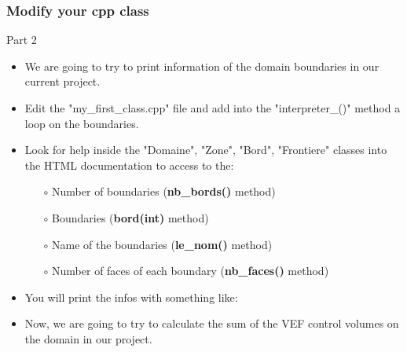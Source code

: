 \documentclass[10pt, hyperref={unicode=true,pdfusetitle, bookmarks=true,bookmarksnumbered=false,bookmarksopen=false, breaklinks=false,pdfborder={0 0 1},backref=true,colorlinks=true,linkcolor=darkblue,pageanchor, urlcolor=darkblue}]{beamer}
\begin{document}
\begin{frame}
\frametitle{Modify your cpp class}
\begin{block}{Part 2}

\begin{itemize}
\item We are going to try to print information of the domain boundaries in our current project.

\item Edit the "my\_first\_class.cpp" file and add into the "interpreter\_()" method a loop on the boundaries.

\item Look for help inside the "Domaine", "Zone", "Bord", "Frontiere" classes into the HTML documentation to access to the:
    \begin{itemize}
    \item [$\circ$] Number of boundaries (\textbf{nb\_bords()} method)
    \item [$\circ$] Boundaries (\textbf{bord(int)} method)
    \item [$\circ$] Name of the boundaries (\textbf{le\_nom()} method)
    \item [$\circ$] Number of faces of each boundary (\textbf{nb\_faces()} method)
    \end{itemize}

\item You will print the infos with something like:
\begin{center}
\end{center}
\item Now, we are going to try to calculate the sum of the VEF control volumes on the domain in our project.
\end{itemize}

\end{block}
\end{frame}
\end{document}
